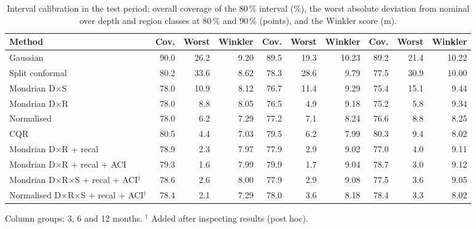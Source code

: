\begin{table}[t]
\caption{Interval calibration in the test period: overall coverage of the 80\,\% interval (\%), the worst absolute deviation from nominal over depth and region classes at 80\,\% and 90\,\% (points), and the Winkler score (m).}
\label{tab:calib}
\centering\small
\begin{adjustbox}{max width=\textwidth}
\begin{tabular}{lrrrrrrrrr}
\toprule
Method & Cov. & Worst & Winkler & Cov. & Worst & Winkler & Cov. & Worst & Winkler \\
\midrule
Gaussian & 90.0 & 26.2 & 9.20 & 89.5 & 19.3 & 10.23 & 89.2 & 21.4 & 10.22 \\
Split conformal & 80.2 & 33.6 & 8.62 & 78.3 & 28.6 & 9.79 & 77.5 & 30.9 & 10.00 \\
Mondrian D$\times$S & 78.0 & 10.9 & 8.12 & 76.7 & 11.4 & 9.29 & 75.4 & 15.1 & 9.44 \\
Mondrian D$\times$R & 78.0 & 8.8 & 8.05 & 76.5 & 4.9 & 9.18 & 75.2 & 5.8 & 9.34 \\
Normalised & 78.0 & 6.2 & 7.29 & 77.2 & 7.1 & 8.24 & 76.6 & 8.8 & 8.25 \\
CQR & 80.5 & 4.4 & 7.03 & 79.5 & 6.2 & 7.99 & 80.3 & 9.4 & 8.02 \\
Mondrian D$\times$R + recal & 78.9 & 2.3 & 7.97 & 77.9 & 2.9 & 9.02 & 77.0 & 4.0 & 9.11 \\
Mondrian D$\times$R + recal + ACI & 79.3 & 1.6 & 7.99 & 79.9 & 1.7 & 9.04 & 78.7 & 3.0 & 9.12 \\
Mondrian D$\times$R$\times$S + recal + ACI$^\dagger$ & 78.6 & 2.6 & 8.00 & 77.9 & 2.9 & 9.08 & 77.5 & 3.6 & 9.05 \\
Normalised D$\times$R$\times$S + recal + ACI$^\dagger$ & 78.4 & 2.1 & 7.29 & 78.0 & 3.6 & 8.18 & 78.4 & 3.3 & 8.02 \\
\bottomrule
\end{tabular}
\end{adjustbox}
\par\smallskip\begin{minipage}{0.95\textwidth}\footnotesize Column groups: 3, 6 and 12 months. $^\dagger$ Added after inspecting results (post hoc).\end{minipage}
\end{table}
